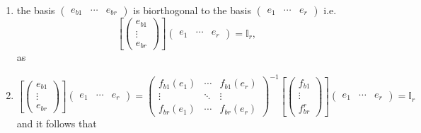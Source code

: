 \documentclass[aps,preprint]{revtex4}
\begin{document}
\begin{enumerate}
\item the basis $\left( 
\begin{array}{ccc}
e_{b1} & \cdots & e_{br}%
\end{array}%
\right) $ is biorthogonal to the basis $\left( 
\begin{array}{ccc}
e_{1} & \cdots & e_{r}%
\end{array}%
\right) $ i.e. 
\begin{equation}
\left[ \left( 
\begin{array}{c}
e_{b1} \\ 
\vdots \\ 
e_{br}%
\end{array}%
\right) \right] \left( 
\begin{array}{ccc}
e_{1} & \cdots & e_{r}%
\end{array}%
\right) =\mathbb{I}_{r},
\end{equation}%
as

\item 
\begin{equation}
\left[ \left( 
\begin{array}{c}
e_{b1} \\ 
\vdots \\ 
e_{br}%
\end{array}%
\right) \right] \left( 
\begin{array}{ccc}
e_{1} & \cdots & e_{r}%
\end{array}%
\right) =\left( 
\begin{array}{ccc}
f_{b1}\left( e_{1}\right) & \cdots & f_{b1}\left( e_{r}\right) \\ 
\vdots & \ddots & \vdots \\ 
f_{br}\left( e_{1}\right) & \cdots & f_{br}\left( e_{r}\right)%
\end{array}%
\right) ^{-1}\left[ \left( 
\begin{array}{c}
f_{b1} \\ 
\vdots \\ 
f_{br}^{r}%
\end{array}%
\right) \right] \left( 
\begin{array}{ccc}
e_{1} & \cdots & e_{r}%
\end{array}%
\right) =\mathbb{I}_{r}
\end{equation}%
and it follows that


\end{enumerate}
\end{document}
